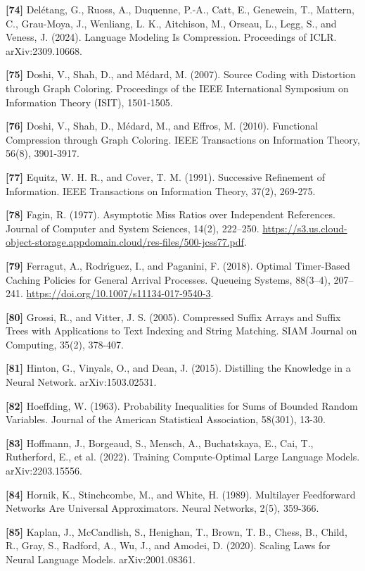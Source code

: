 \documentclass[
]{article}
\begin{document}
\textbf{{[}74{]}} Del\'etang, G., Ruoss, A., Duquenne, P.-A., Catt, E.,
Genewein, T., Mattern, C., Grau-Moya, J., Wenliang, L. K.,
Aitchison, M., Orseau, L., Legg, S., and Veness, J. (2024). Language
Modeling Is Compression. Proceedings of ICLR. arXiv:2309.10668.

\textbf{{[}75{]}} Doshi, V., Shah, D., and M\'edard, M. (2007). Source
Coding with Distortion through Graph Coloring. Proceedings of the IEEE
International Symposium on Information Theory (ISIT), 1501-1505.

\textbf{{[}76{]}} Doshi, V., Shah, D., M\'edard, M., and Effros, M.
(2010). Functional Compression through Graph Coloring. IEEE
Transactions on Information Theory, 56(8), 3901-3917.

\textbf{{[}77{]}} Equitz, W. H. R., and Cover, T. M. (1991). Successive
Refinement of Information. IEEE Transactions on Information Theory,
37(2), 269-275.

\textbf{{[}78{]}} Fagin, R. (1977). Asymptotic Miss Ratios
over Independent References. Journal of Computer and System Sciences,
14(2), 222--250. \url{https://s3.us.cloud-object-storage.appdomain.cloud/res-files/500-jcss77.pdf}.

\textbf{{[}79{]}} Ferragut, A., Rodr{\'\i}guez, I., and Paganini, F.
(2018). Optimal Timer-Based Caching Policies for General Arrival
Processes. Queueing Systems, 88(3--4), 207--241.
\url{https://doi.org/10.1007/s11134-017-9540-3}.

\textbf{{[}80{]}} Grossi, R., and Vitter, J. S. (2005). Compressed
Suffix Arrays and Suffix Trees with Applications to Text Indexing and
String Matching. SIAM Journal on Computing, 35(2), 378-407.

\textbf{{[}81{]}} Hinton, G., Vinyals, O., and Dean, J. (2015).
Distilling the Knowledge in a Neural Network. arXiv:1503.02531.

\textbf{{[}82{]}} Hoeffding, W. (1963). Probability Inequalities for
Sums of Bounded Random Variables. Journal of the American Statistical
Association, 58(301), 13-30.

\textbf{{[}83{]}} Hoffmann, J., Borgeaud, S., Mensch, A., Buchatskaya,
E., Cai, T., Rutherford, E., et al. (2022). Training Compute-Optimal
Large Language Models. arXiv:2203.15556.

\textbf{{[}84{]}} Hornik, K., Stinchcombe, M., and White, H. (1989).
Multilayer Feedforward Networks Are Universal Approximators. Neural
Networks, 2(5), 359-366.

\textbf{{[}85{]}} Kaplan, J., McCandlish, S., Henighan, T., Brown,
T. B., Chess, B., Child, R., Gray, S., Radford, A., Wu, J., and
Amodei, D. (2020). Scaling Laws for Neural Language Models.
arXiv:2001.08361.
\end{document}
